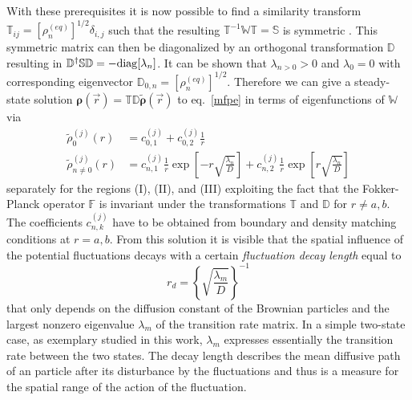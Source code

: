 \documentclass[preprint,superscriptaddress]{revtex4-1}
\newcommand{\vect}[1]{\boldsymbol{\mathbf{#1}}}
\begin{document}
With these prerequisites it is now possible to find a similarity transform $\mathbb{T}_{ij}=[\rho_n^{(eq)}]^{1/2}\delta_{i,j}$ such that the resulting $\mathbb{T}^{-1}\mathbb{W}\mathbb{T} = \mathbb{S}$ is symmetric \cite{Oppenheim1977}. This symmetric matrix can then be diagonalized by an orthogonal transformation $\mathbb{D}$ resulting in $\mathbb{D}^{\dagger}\mathbb{S}\mathbb{D} = - {\rm diag}[\lambda_n]$. It can be shown \cite{VanKampen1992} that $\lambda_{n>0}>0$ and $\lambda_0=0$ with corresponding eigenvector $\mathbb{D}_{0,n}=[\rho_n^{(eq)}]^{1/2}$.   Therefore we can give a steady-state solution $\vect{\rho}(\vec{r}) = \mathbb{T}\mathbb{D}\tilde{\vect{\rho}}(\vec{r})$ to eq.~\eqref{mfpe} in terms of eigenfunctions of $\mathbb{W}$ via
\begin{align}
    \label{solution}
    \tilde{\rho}_{0}^{(j)}(r) &= c_{0,1}^{(j)} + c_{0,2}^{(j)} \frac{1}{r} \\
    \tilde{\rho}_{n \ne 0}^{(j)}(r) &= c_{n,1}^{(j)}\frac{1}{r} \exp\left[-r\sqrt{\frac{\lambda_n}{D}}\right] + c_{n,2}^{(j)}\frac{1}{r} \exp\left[r\sqrt{\frac{\lambda_n}{D}}\right]  \nonumber
\end{align}
separately for the regions (I), (II), and (III) exploiting the fact that the Fokker-Planck operator $\mathbb{F}$ is invariant under the transformations $\mathbb{T}$ and $\mathbb{D}$ for $r\ne a, b$. The coefficients $c^{(j)}_{n,k}$ have to be obtained from boundary and density matching conditions at $r=a,b$. From this solution it is visible that the spatial influence of the potential fluctuations decays with a certain \textit{fluctuation decay length} equal to
\begin{equation}
    r_d = \left\{\sqrt{\frac{\lambda_m}{D}}\right\}^{-1}
    \label{decay_length}
\end{equation}
that only depends on the diffusion constant of the Brownian particles and the largest nonzero eigenvalue $\lambda_m$ 
of the transition rate matrix. In a simple two-state case, as exemplary studied in this work, $\lambda_m$ 
expresses essentially the transition rate between the two states. The decay length describes the mean diffusive path 
of an particle after its disturbance by the fluctuations and thus is a measure for the spatial 
range of the action of the fluctuation.
\end{document}
